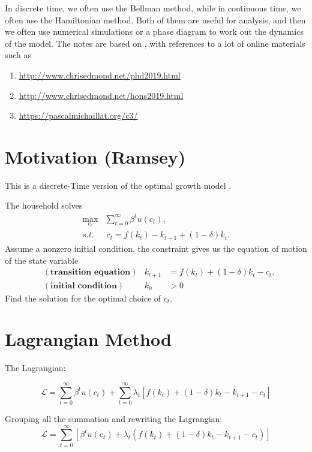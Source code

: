 \documentclass[11pt,a4paper]{book}
\theoremstyle{definition}\newtheorem{definition}{Definition}
\theoremstyle{definition}\newtheorem{fact}{Fact}
\theoremstyle{definition}\newtheorem{remark}{Remark}
\theoremstyle{definition}\newtheorem{ex}{Ex.}
\theoremstyle{definition}\newtheorem{project}{Project}
\theoremstyle{definition}\newtheorem{problem}{Problem}
\theoremstyle{definition}\newtheorem{example}{Example}
\numberwithin{theorem}{section}
\numberwithin{corollary}{chapter}
\numberwithin{assumption}{chapter}
\numberwithin{definition}{chapter}
\numberwithin{prop}{chapter}
\numberwithin{notation}{chapter}
\numberwithin{problem}{chapter}
\numberwithin{example}{chapter}
\numberwithin{fact}{chapter}
\numberwithin{ex}{chapter}
\begin{document}
	In discrete time, we often use the Bellman method, while in continuous time, we often use the Hamiltonian method. Both of them are useful for analysis, and then we often use numerical simulations or a phase diagram to work out the dynamics of the model. The notes are based on \citet{chiang1992element, sydsaeter2008further, heer2009dynamic, campante2021advanced}, with references to a lot of online materials such as 
	\begin{enumerate}
		\item \url{http://www.chrisedmond.net/phd2019.html}
		\item \url{http://www.chrisedmond.net/hons2019.html}
		\item \url{https://pascalmichaillat.org/c3/}
	\end{enumerate}
	
	\section{Motivation (Ramsey) }
	This is a discrete-Time version of the optimal growth model \citep{ramsey1928mathematical}. 
	
	The household solves
	\begin{align*}
		\max_{c_t} & \sum^\infty_{t=0} \beta^t u(c_t), \\
		s.t. &\ c_t = f(k_t) - k_{t+1} + (1-\delta) k_t.
	\end{align*}
	Assume a nonzero initial condition, the constraint gives us the equation of motion of the state variable
	\begin{align*}
		&(\textbf{transition equation}) & k_{t+1} &= f(k_t) + (1-\delta)k_t - c_t, \\
		&(\textbf{initial condition}) & k_0 &> 0
	\end{align*}
	Find the solution for the optimal choice of $c_t$.
	
	\section{Lagrangian Method}
	The Lagrangian:

$$
    \mathcal{L} = \sum_{t=0}^{\infty} \beta^t u(c_t) + \sum_{t=0}^{\infty} \lambda_t \left[ f(k_t) + (1- \delta) k_t - k_{t+1} - c_t \right]
$$

Grouping all the summation and rewriting the Lagrangian:
$$
    \mathcal{L} = \sum_{t=0}^{\infty} \left[ \beta^t u(c_t) + \lambda_t \left( f(k_t) + (1- \delta)k_t - k_{t+1} - c_t \right) \right]
$$
\end{document}
